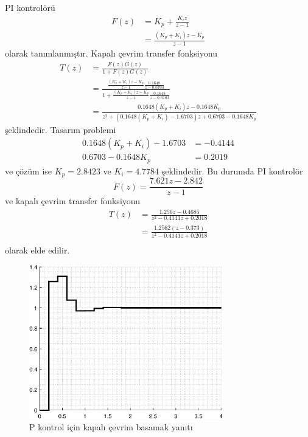 PI kontrolörü 
\begin{equation}
\begin{split}
    F(z)&=K_p+\frac{K_iz}{z-1}\\
    &=\frac{(K_p+K_i)z-K_p}{z-1}
\end{split}
\end{equation}
olarak tanımlanmıştır. Kapalı çevrim transfer fonksiyonu 
\begin{equation}
    \begin{split}
        T(z)&=\frac{F(z)G(z)}{1+F(z)G(z)}\\
        &=\frac{\frac{(K_p+K_i)z-K_p}{z-1}\frac{0.1648}{z-0.6703}}{1+\frac{(K_p+K_i)z-K_p}{z-1}\frac{0.1648}{z-0.6703}}\\
        &=\frac{0.1648(K_p+K_i)z-0.1648K_p}{z^2+(0.1648(K_p+K_i)-1.6703)z+0.6703-0.1648K_p}
    \end{split}
\end{equation}
şeklindedir. Tasarım problemi
\begin{equation}
    \begin{split}
       0.1648(K_p+K_i)-1.6703&=-0.4144\\
       0.6703-0.1648K_p&=0.2019
    \end{split}
\end{equation}
ve çözüm ise $K_p=2.8423$ ve $K_i=4.7784$ şeklindedir. Bu durumda PI kontrolör
\begin{equation}
        F(z)=\frac{7.621 z - 2.842}{z-1}
\end{equation}
ve kapalı çevrim transfer fonksiyonu
\begin{equation}
\begin{split}
    T(z)&=\frac{1.256 z - 0.4685}{z^2 - 0.4141 z + 0.2018}\\
    &=\frac{1.2562 (z-0.373)}{z^2 - 0.4141 z + 0.2018}\\
\end{split}
\end{equation}
olarak elde edilir.

\begin{figure}[!htb]
    \centering
    \includegraphics[width=0.75\textwidth]{img/lec6_step3}
    \caption{P kontrol için kapalı çevrim basamak yanıtı}
    \label{fig:lec6_step3}
\end{figure}